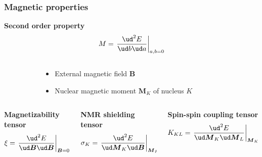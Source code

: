 \begin{frame}
    \frametitle{Magnetic properties}
    \centering
    \textbf{Second order property}
    \begin{equation}
        \nonumber
        M = \left. \frac{\ud^2 E}{\ud b \ud a}\right|_{a,b=0}
    \end{equation}

    \vspace{8mm}

    \begin{columns}
    \begin{column}[b]{0.15\linewidth}
    \end{column}

    \begin{column}[b]{0.65\linewidth}
    \begin{itemize}
        \item External magnetic field $\boldsymbol{B}$
        \item Nuclear magnetic moment $\boldsymbol{M}_K$ of nucleus $K$
    \end{itemize}
    \end{column}

    \begin{column}[b]{0.2\linewidth}
    \end{column}
    \end{columns}

    \vspace{13mm}

    \begin{columns}
    \begin{column}[b]{0.3\linewidth}
        \centering
        \textbf{Magnetizability tensor}
        \begin{equation}
            \nonumber
            \xi = \left. \frac{\ud^2 E}{\ud \boldsymbol{B} \ud \boldsymbol{B}}\right|_{\boldsymbol{B}=0}
        \end{equation}
    \end{column}

    \begin{column}[b]{0.4\linewidth}
        \centering
        \textbf{NMR shielding tensor}
        \begin{equation}
            \nonumber
            \sigma_K = \left. \frac{\ud^2 E}{\ud \boldsymbol{M}_K \ud
            \boldsymbol{B}}\right|_{\boldsymbol{M}_K,\boldsymbol{B}=0}
        \end{equation}
    \end{column}

    \begin{column}[b]{0.4\linewidth}
        \centering
        \textbf{Spin-spin coupling tensor}
        \begin{equation}
            \nonumber
            K_{KL} = \left. \frac{\ud^2 E}{\ud \boldsymbol{M}_K\ud
            \boldsymbol{M}_L}\right|_{\boldsymbol{M}_K,\boldsymbol{M}_L=0}
        \end{equation}
    \end{column}
    \end{columns}

\end{frame}



